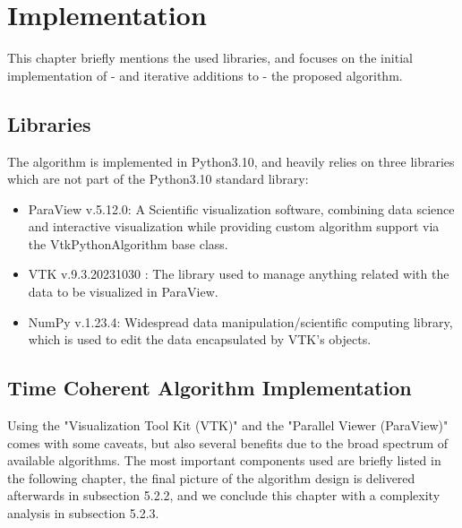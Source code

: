 \chapter{Implementation}
This chapter briefly mentions the used libraries, and focuses on the initial implementation of - and iterative additions to - the proposed algorithm.
\section{Libraries}
The algorithm is implemented in Python3.10, and heavily relies on three libraries which are not part of the Python3.10 standard library:
\begin{itemize}
    \item ParaView v.5.12.0: A Scientific visualization software, combining data science and interactive visualization while providing custom algorithm support via the VtkPythonAlgorithm base class.
    \item VTK v.9.3.20231030 : The library used to manage anything related with the data to be visualized in ParaView.
    \item NumPy v.1.23.4: Widespread data manipulation/scientific computing library, which is used to edit the data encapsulated by VTK's objects.
\end{itemize}

\section{Time Coherent Algorithm Implementation}
Using the "Visualization Tool Kit (VTK)" and the "Parallel Viewer (ParaView)" comes with some caveats,
but also several benefits due to the broad spectrum of available algorithms.
The most important components used are briefly listed in the following chapter,
the final picture of the algorithm design is delivered afterwards in subsection 5.2.2,
and we conclude this chapter with a complexity analysis in subsection 5.2.3.

